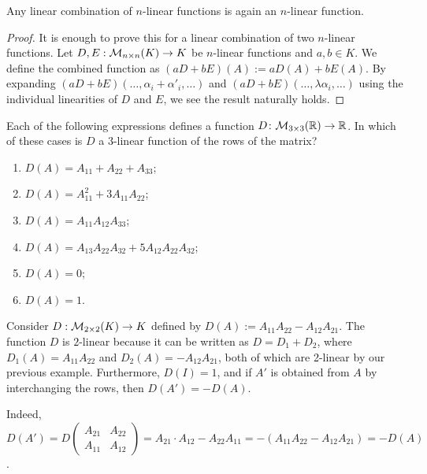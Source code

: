 \begin{lemma}\label{lem:linear_comb_n_linear}
  Any linear combination of $n$-linear functions is again an $n$-linear function.
\end{lemma}

\begin{proof}
  It is enough to prove this for a linear combination of two $n$-linear functions. Let $D, E : \mathcal{M}_{n \times n}(K) \to K$ be $n$-linear functions and $a, b \in K$. We define the combined function as $(aD + bE)(A) := aD(A) + bE(A)$.
  By expanding $(aD+bE)(\dots, \alpha_i + \alpha'_i, \dots)$ and $(aD+bE)(\dots, \lambda \alpha_i, \dots)$ using the individual linearities of $D$ and $E$, we see the result naturally holds.
\end{proof}

\begin{exercise}
\label{exc:multilinear_candidates_3x3}
Each of the following expressions defines a function $D \colon \mathcal{M}_{3 \times 3}(\mathbb{R}) \to \mathbb{R}$. In which of these cases is $D$ a $3$-linear function of the rows of the matrix?
\begin{enumerate}
    \item $D(A) = A_{11} + A_{22} + A_{33}$;
    \item $D(A) = A_{11}^2 + 3A_{11} A_{22}$;
    \item $D(A) = A_{11} A_{12} A_{33}$;
    \item $D(A) = A_{13} A_{22} A_{32} + 5A_{12} A_{22} A_{32}$;
    \item $D(A) = 0$;
    \item $D(A) = 1$.
\end{enumerate}
\end{exercise}

\begin{example}\label{ex:2_linear_det}
  Consider $D : \mathcal{M}_{2 \times 2}(K) \to K$ defined by $D(A) := A_{11}A_{22} - A_{12}A_{21}$. The function $D$ is $2$-linear because it can be written as $D = D_1 + D_2$, where $D_1(A) = A_{11}A_{22}$ and $D_2(A) = -A_{12}A_{21}$, both of which are 2-linear by our previous example. Furthermore, $D(I) = 1$, and if $A'$ is obtained from $A$ by interchanging the rows, then $D(A') = -D(A)$.

  Indeed, $D(A') = D\left(\begin{smallmatrix} A_{21} & A_{22} \\ A_{11} & A_{12} \end{smallmatrix}\right) = A_{21} \cdot A_{12} - A_{22}A_{11} = -(A_{11}A_{22} - A_{12}A_{21}) = -D(A)$.
\end{example}

